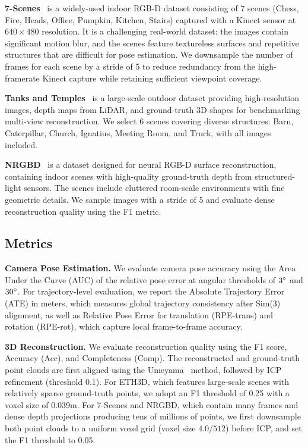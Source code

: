 \noindent\textbf{7-Scenes}~\cite{shotton2013scene} is a widely-used
indoor RGB-D dataset consisting of 7 scenes (Chess, Fire, Heads,
Office, Pumpkin, Kitchen, Stairs) captured with a Kinect sensor at
$640 \times 480$ resolution.
It is a challenging real-world dataset: the images contain significant
motion blur, and the scenes feature textureless surfaces and repetitive
structures that are difficult for pose estimation.
We downsample the number of frames for each scene by a stride of 5
to reduce redundancy from the high-framerate Kinect capture while
retaining sufficient viewpoint coverage.

\noindent\textbf{Tanks and Temples}~\cite{Knapitsch2017} is a
large-scale outdoor dataset providing high-resolution images, depth
maps from LiDAR, and ground-truth 3D shapes for benchmarking
multi-view reconstruction.
We select 6 scenes covering diverse structures: Barn, Caterpillar,
Church, Ignatius, Meeting Room, and Truck, with all images included.

\noindent\textbf{NRGBD}~\cite{azinovic2022neural} is a dataset
designed for neural RGB-D surface reconstruction, containing indoor
scenes with high-quality ground-truth depth from structured-light
sensors.
The scenes include cluttered room-scale environments with fine
geometric details.
We sample images with a stride of 5 and evaluate dense reconstruction
quality using the F1 metric.

\subsection{Metrics}
\label{sec:metrics}

\noindent\textbf{Camera Pose Estimation.}
We evaluate camera pose accuracy using the Area Under the Curve (AUC) of the relative pose error at angular thresholds of $3\degree$ and $30\degree$.
For trajectory-level evaluation, we report the Absolute Trajectory Error (ATE) in meters, which measures global trajectory consistency after Sim(3) alignment, as well as Relative Pose Error for translation (RPE-trans) and rotation (RPE-rot), which capture local frame-to-frame accuracy.

\noindent\textbf{3D Reconstruction.} 
We evaluate reconstruction quality using the F1 score, Accuracy (Acc), and Completeness (Comp).
The reconstructed and ground-truth point clouds are first aligned using the Umeyama~
\cite{umeyama2002least} method, followed by ICP refinement (threshold 0.1).
For ETH3D, which features large-scale scenes with relatively sparse ground-truth points, we adopt an F1 threshold of 0.25 with a voxel size of 0.039m.
For 7-Scenes and NRGBD, which contain many frames and dense depth projections producing tens of millions of points, we first downsample both point clouds to a uniform voxel grid (voxel size $4.0/512$) before ICP, and set the F1 threshold to 0.05.



